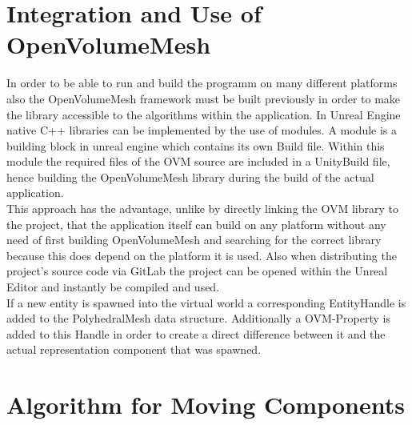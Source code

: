 \documentclass{report}
\begin{document}
	\section{Integration and Use of OpenVolumeMesh}
	\startsection
		In order to be able to run and build the programm on many different platforms also the OpenVolumeMesh framework must be built previously in order to make the library accessible to the algorithms within the application. In Unreal Engine native C++ libraries can be implemented by the use of modules. A module is a building block in unreal engine which contains its own Build file. Within this module the required files of the OVM source are included in a UnityBuild file, hence building the OpenVolumeMesh library during the build of the actual application. \\
		This approach has the advantage, unlike by directly linking the OVM library to the project, that the application itself can build on any platform without any need of first building OpenVolumeMesh and searching for the correct library because this does depend on the platform it is used. Also when distributing the project's source code via GitLab the project can be opened within the Unreal Editor and instantly be compiled and used. \\
		If a new entity is spawned into the virtual world a corresponding EntityHandle is added to the PolyhedralMesh data structure. Additionally a OVM-Property is added to this Handle in order to create a direct difference between it and the actual representation component that was spawned.
	\closesection
	
	\section{Algorithm for Moving Components}
	\startsection
	\closesection
		
\end{document}
